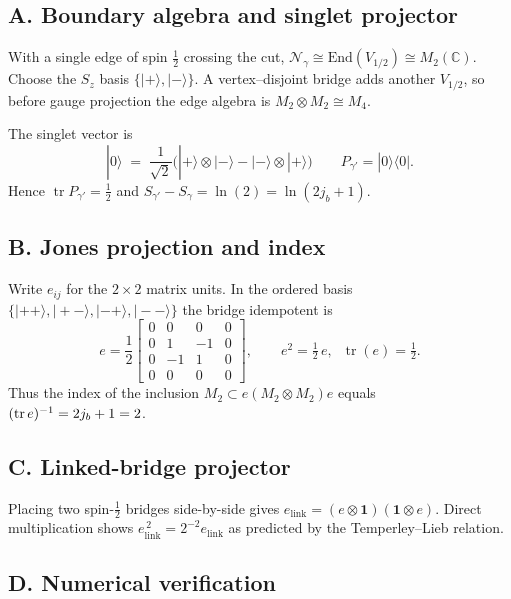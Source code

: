 \documentclass[11pt]{article}
\begin{document}
\subsection*{A. Boundary algebra and singlet projector}

With a single edge of spin $\tfrac12$ crossing the cut,
$\mathcal N_{\gamma}\cong\mathrm{End}(V_{1/2})\cong M_2(\mathbb C)$.
Choose the $S_z$ basis $\{|+\rangle,|-\rangle\}$.
A vertex–disjoint bridge adds another $V_{1/2}$, so before gauge
projection the edge algebra is $M_2\!\otimes\!M_2\cong M_4$.

The singlet vector is
\[
  |0\rangle \;=\;
  \frac{1}{\sqrt2}\bigl(|+\rangle\!\otimes|-\rangle-
                        |-\rangle\!\otimes|+\rangle\bigr)
\qquad
  P_{\gamma'} = |0\rangle\langle 0|.
\]
Hence $\operatorname{tr}P_{\gamma'}=\tfrac12$ and
$S_{\gamma'}-S_{\gamma}= \ln(2)=\ln(2j_b+1)$.

\subsection*{B. Jones projection and index}

Write $e_{ij}$ for the $2\times2$ matrix units.
In the ordered basis
$\{|+\!+\rangle,|+-\rangle,|-+\rangle,|--\rangle\}$ the
bridge idempotent is
\[
  e=\frac12
  \begin{bmatrix}
    0&0&0&0\\
    0&1&-1&0\\
    0&-1&1&0\\
    0&0&0&0
  \end{bmatrix},
  \qquad
  e^2=\tfrac12\,e,\;\;
  \operatorname{tr}(e)=\tfrac12.
\]
Thus the index of the inclusion
$M_2\subset e(M_2\otimes M_2)e$ equals $({\rm tr}\,e)^{-1}=2j_b+1=2$.

\subsection*{C. Linked-bridge projector}

Placing two spin-$\tfrac12$ bridges side-by-side gives
\(
  e_{\mathrm{link}}=(e\otimes\mathbf1)(\mathbf1\otimes e)
\).
Direct multiplication shows
$e_{\mathrm{link}}^{\,2}=2^{-2}e_{\mathrm{link}}$ as predicted by the
Temperley–Lieb relation.

\subsection*{D. Numerical verification}
\end{document}
